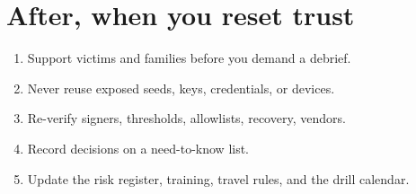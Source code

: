\section{After, when you reset trust}

\begin{enumerate}
  \item Support victims and families before you demand a
  debrief.
  \item Never reuse exposed seeds, keys, credentials, or
  devices.
  \item Re-verify signers, thresholds, allowlists,
  recovery, vendors.
  \item Record decisions on a need-to-know list.
  \item Update the risk register, training, travel rules,
  and the drill calendar.
\end{enumerate}
